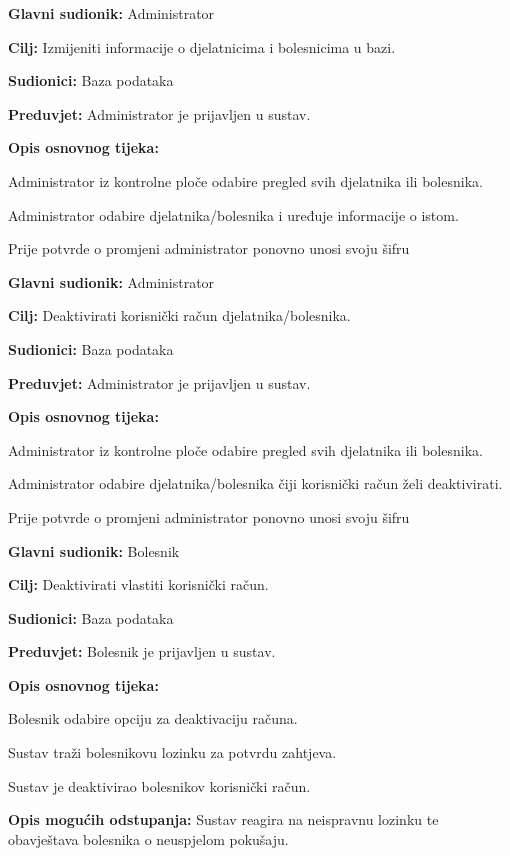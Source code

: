 	\item \textbf{Glavni sudionik:} Administrator
	\item \textbf{Cilj:} Izmijeniti informacije o djelatnicima i bolesnicima u bazi.
	\item \textbf{Sudionici:} Baza podataka
	\item \textbf{Preduvjet:} Administrator je prijavljen u sustav.
	\item \textbf{Opis osnovnog tijeka:}
	\begin{packed_enum}
		\item Administrator iz kontrolne ploče odabire pregled svih djelatnika ili bolesnika.
		\item Administrator odabire djelatnika/bolesnika i uređuje informacije o istom.
        	\item Prije potvrde o promjeni administrator ponovno unosi svoju šifru
	\end{packed_enum}
\closeusecase


	\item \textbf{Glavni sudionik:} Administrator
	\item \textbf{Cilj:} Deaktivirati korisnički račun djelatnika/bolesnika.
	\item \textbf{Sudionici:} Baza podataka
	\item \textbf{Preduvjet:} Administrator je prijavljen u sustav.
	\item \textbf{Opis osnovnog tijeka:}
	\begin{packed_enum}
		\item Administrator iz kontrolne ploče odabire pregled svih djelatnika ili bolesnika.
		\item Administrator odabire djelatnika/bolesnika čiji korisnički račun želi deaktivirati.
        	\item Prije potvrde o promjeni administrator ponovno unosi svoju šifru
	\end{packed_enum}
\closeusecase


	\item \textbf{Glavni sudionik:} Bolesnik
	\item \textbf{Cilj:} Deaktivirati vlastiti korisnički račun.
	\item \textbf{Sudionici:} Baza podataka
	\item \textbf{Preduvjet:} Bolesnik je prijavljen u sustav.
	\item \textbf{Opis osnovnog tijeka:}
	\begin{packed_enum}
		\item Bolesnik odabire opciju za deaktivaciju računa.
		\item Sustav traži bolesnikovu lozinku za potvrdu zahtjeva.
		\item Sustav je deaktivirao bolesnikov korisnički račun.
	\end{packed_enum}
	\item \textbf{Opis mogućih odstupanja:}
	Sustav reagira na neispravnu lozinku te obavještava bolesnika o neuspjelom pokušaju.
\closeusecase


